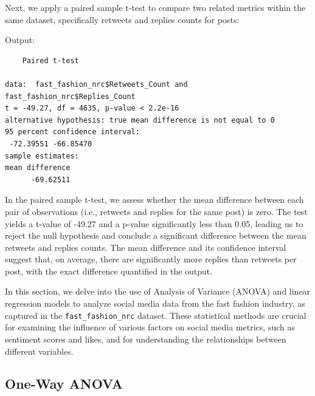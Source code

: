 \documentclass[
]{book}
\newenvironment{Shaded}{\begin{snugshade}}{\end{snugshade}}
\newcommand{\AttributeTok}[1]{\textcolor[rgb]{0.13,0.29,0.53}{#1}}
\newcommand{\ConstantTok}[1]{\textcolor[rgb]{0.56,0.35,0.01}{#1}}
\newcommand{\FunctionTok}[1]{\textcolor[rgb]{0.13,0.29,0.53}{\textbf{#1}}}
\newcommand{\NormalTok}[1]{#1}
\newcommand{\OtherTok}[1]{\textcolor[rgb]{0.56,0.35,0.01}{#1}}
\newcommand{\SpecialCharTok}[1]{\textcolor[rgb]{0.81,0.36,0.00}{\textbf{#1}}}
\begin{document}
Next, we apply a paired sample t-test to compare two related metrics within the same dataset, specifically retweets and replies counts for posts:

\begin{Shaded}
\end{Shaded}

Output:

\begin{verbatim}
    Paired t-test

data:  fast_fashion_nrc$Retweets_Count and fast_fashion_nrc$Replies_Count
t = -49.27, df = 4635, p-value < 2.2e-16
alternative hypothesis: true mean difference is not equal to 0
95 percent confidence interval:
 -72.39551 -66.85470
sample estimates:
mean difference 
      -69.62511 
\end{verbatim}

In the paired sample t-test, we assess whether the mean difference between each pair of observations (i.e., retweets and replies for the same post) is zero. The test yields a t-value of -49.27 and a p-value significantly less than 0.05, leading us to reject the null hypothesis and conclude a significant difference between the mean retweets and replies counts. The mean difference and its confidence interval suggest that, on average, there are significantly more replies than retweets per post, with the exact difference quantified in the output.

In this section, we delve into the use of Analysis of Variance (ANOVA) and linear regression models to analyze social media data from the fast fashion industry, as captured in the \texttt{fast\_fashion\_nrc} dataset. These statistical methods are crucial for examining the influence of various factors on social media metrics, such as sentiment scores and likes, and for understanding the relationships between different variables.

\hypertarget{one-way-anova}{%
\subsection{One-Way ANOVA}\label{one-way-anova}}
\end{document}
